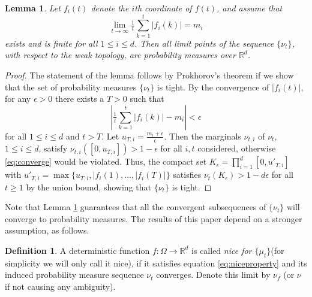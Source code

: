 \documentclass[english]{article} %
\newcommand{\real}{\mathbb{R}}
\providecommand{\lemmaname}{Lemma}
\providecommand{\definitionname}{Definition}
\theoremstyle{plain}
\newtheorem{lemma}[thm]{\protect\lemmaname}
\theoremstyle{definition}
\newtheorem{definition}{\protect\definitionname}
\theoremstyle{remark}
\newcounter{assumption}%
\begin{document}
\begin{lemma}
\label{lem:nicefunction}
Let $f_i(t)$ denote the $i$th coordinate of $f(t)$, and assume that
\begin{equation}
\label{eq:niceproperty}
\lim_{t\to\infty} \tfrac{1}{t}\sum_{k=1}^t |f_i(k)|=m_i
\end{equation}
exists and is finite for all $1 \le i \le d$.
Then all limit points of the sequence $\{\nu_t\}$, with respect to the weak topology, are probability measures over $\real^d$.
\end{lemma}
\begin{proof}
The statement of the lemma follows by Prokhorov's theorem if we show that the set of probability measures $\{\nu_t\}$ is tight.
By the convergence of $|f_i(t)|$, for any $\epsilon>0$ there exists a $T>0$ such that
\begin{equation}
\label{eq:converge}
\left| \tfrac{1}{t} \sum_{k=1}^t |f_i(k)| - m_i \right| <\epsilon
\end{equation}
for all $1 \le i \le d$ and $t>T$. Let $u_{T,i}=\tfrac{m_i+\epsilon}{\epsilon}$. Then the marginals
$\nu_{t,i}$ of $\nu_t$, $1\le i \le d$, satisfy $\nu_{t,i}([0,u_{T,i}]) > 1-\epsilon$ for all $i,t$ considered, otherwise \eqref{eq:converge} would be violated. Thus, the compact set
$K_{\epsilon}=\prod_{i=1}^d [0,u'_{T,i}]$ with $u'_{T,i}=\max\{u_{T,i},|f_i(1),\ldots,|f_i(T)|\}$ satisfies
$\nu_t(K_{\epsilon})>1-d \epsilon$ for all $t \ge 1$ by the union bound, showing that $\{\nu_t\}$ is tight.
\end{proof}
\fi
Note that Lemma \ref{lem:nicefunction} guarantees that all the convergent subsequences of $\{\nu_t\}$ will converge to probability measures. The results of this paper depend on a stronger assumption, as follows.

\begin{definition}
A deterministic function $f:\Omega \rightarrow \real^d$ is called \emph{nice for $\{\mu_t\}$}(for simplicity we will only call it nice), 
if it satisfies equation \eqref{eq:niceproperty} and its induced probability measure sequence $\nu_t$ converges. 
Denote this limit by $\nu_f$ (or $\nu$ if not causing any ambiguity). 
\end{definition}
\end{document}
